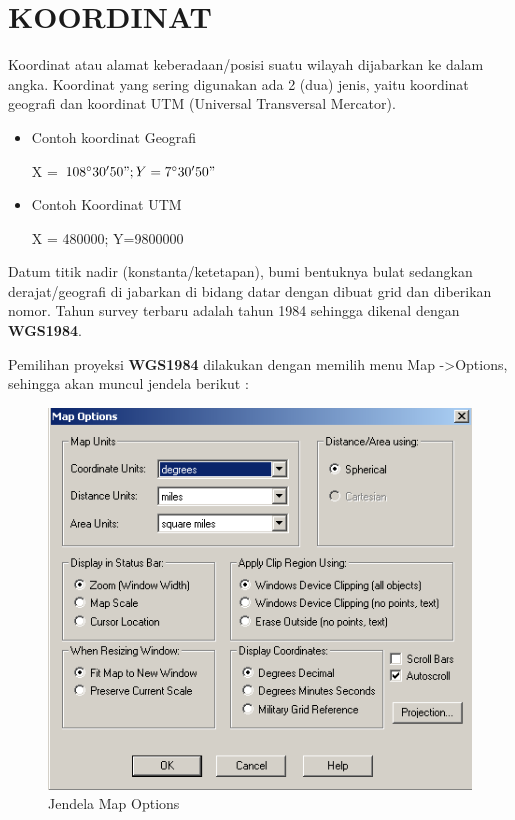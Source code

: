 \chapter{KOORDINAT}

Koordinat atau alamat keberadaan/posisi suatu wilayah dijabarkan ke dalam angka. Koordinat yang sering digunakan ada 2 (dua) jenis, yaitu koordinat geografi dan koordinat UTM (Universal Transversal Mercator).

\begin{itemize}
  \item Contoh koordinat Geografi
  
  X = $108^{\circ}30'50"; Y=7^{\circ}30'50"$
  
  \item Contoh Koordinat UTM
  
  X = 480000; Y=9800000
\end{itemize}

Datum titik nadir (konstanta/ketetapan), bumi bentuknya bulat sedangkan derajat/geografi di jabarkan di bidang datar dengan dibuat grid dan diberikan nomor. Tahun survey terbaru adalah tahun 1984 sehingga dikenal dengan \textbf{WGS1984}.

Pemilihan proyeksi \textbf{WGS1984} dilakukan dengan memilih menu Map -\textgreater Options, sehingga akan muncul jendela berikut :

\begin{figure}[H]
  \centering
  \includegraphics[width=1\textwidth]{./resources/045-jendela-map-option}
  \caption{Jendela Map Options}
\end{figure}

